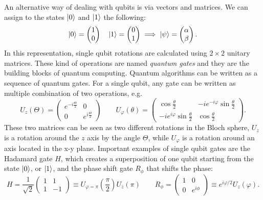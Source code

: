 An alternative way of dealing with qubits is via vectors and matrices. We can assign to the states $\ket{0}$ and $\ket{1}$ the following:
\begin{equation}
\ket{0} = \begin{pmatrix}
 1 \\
 0
\end{pmatrix} \quad
\ket{1} = \begin{pmatrix}
 0 \\
 1
\end{pmatrix} \implies \ket{\psi} = \begin{pmatrix}
 \alpha \\
 \beta
\end{pmatrix}.
\end{equation}
In this representation, single qubit rotations are calculated using $2\times2$ unitary matrices. These kind of operations are named \emph{quantum gates} and they are the building blocks of quantum computing. Quantum algorithms can be written as a sequence of quantum gates. For a single qubit, any gate can be written as multiple combination of two operations, e.g. \cite{hempel}
\begin{equation}
\label{quantumgates}
U_z(\Theta) =  \begin{pmatrix}
 e^{-i\frac{\Theta}{2}} & 0 \\
 0 & e^{i\frac{\Theta}{2}}
\end{pmatrix} \qquad U_\varphi(\theta) = \begin{pmatrix}
\cos\frac{\theta}{2} & -i e^{-i\varphi}\sin\frac{\theta}{2} \\
-ie^{i\varphi}\sin\frac{\theta}{2} & \cos\frac{\theta}{2}
\end{pmatrix}.
\end{equation}
These two matrices can be seen as two different rotations in the Bloch sphere, $U_z$ is a rotation around the $z$ axis by the angle $\Theta$, while $U_\varphi$ is a rotation around an axis located in the x-y plane. Important examples of single qubit gates are the Hadamard gate $H$, which creates a superposition of one qubit starting from the state $\ket{0}$, or $\ket{1}$, and the phase shift gate $R_\phi$ that shifts the phase:
\begin{equation}
\label{Hadamard}
 H = \frac{1}{\sqrt{2}}\begin{pmatrix}
 1  & 1\\
1 & -1
 \end{pmatrix} \equiv U_{\varphi=\pi}\left(\frac{\pi}{2}\right)U_z(\pi) \qquad R_\phi = \begin{pmatrix}
 1  & 0\\
0 & e^{i\phi}
 \end{pmatrix} \equiv e^{i\varphi/2}U_z(\varphi).
\end{equation}
